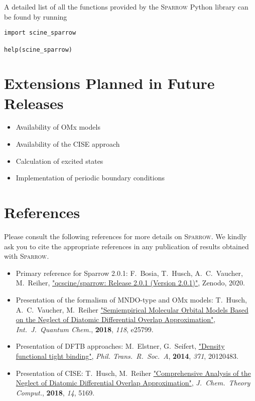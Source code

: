 \documentclass[]{tufte-book}
\begin{document}
A detailed list of all the functions provided by the \textsc{Sparrow} Python library can be found by running
\begin{verbatim}
import scine_sparrow

help(scine_sparrow)
\end{verbatim}




\chapter{Extensions Planned in Future Releases}
\begin{itemize}
\item Availability of OMx models
\item Availability of the CISE approach
\item Calculation of excited states
\item Implementation of periodic boundary conditions
\end{itemize}



\chapter{References}

Please consult the following references for more details on \textsc{Sparrow}.
We kindly ask you to cite the appropriate references in any publication of results obtained with \textsc{Sparrow}.
\vspace{1.0cm}

\begin{itemize}
\item Primary reference for Sparrow 2.0.1:
F.~Bosia, T.~Husch, A.~C.~Vaucher, M.~Reiher, \href{https://doi.org/10.5281/zenodo.3244105}{"qcscine/sparrow: Release 2.0.1 (Version 2.0.1)"}, Zenodo, 2020.
\item Presentation of the formalism of MNDO-type and OMx models: \newline
T.~Husch, A.~C.~Vaucher, M.~Reiher \href{https://doi.org/10.1002/qua.25799}{"Semiempirical Molecular Orbital Models Based on the Neglect of Diatomic Differential Overlap Approximation"}, \textit{Int.~J.~Quantum Chem.}, \textbf{2018}, \textit{118}, e25799.
\item Presentation of DFTB approaches: \newline
M.~Elstner, G.~Seifert, \href{https://doi.org/10.1098/rsta.2012.0483}{"Density functional tight binding"}, \textit{Phil. Trans.~R.~Soc.~A}, \textbf{2014}, \textit{371}, 20120483.
\item Presentation of CISE: \newline
T.~Husch, M.~Reiher \href{https://doi.org/10.1021/acs.jctc.8b00601}{"Comprehensive Analysis of the Neglect of Diatomic Differential Overlap Approximation"}, \textit{J.~Chem.~Theory Comput.}, \textbf{2018}, \textit{14}, 5169.
\end{itemize}





\end{document}
